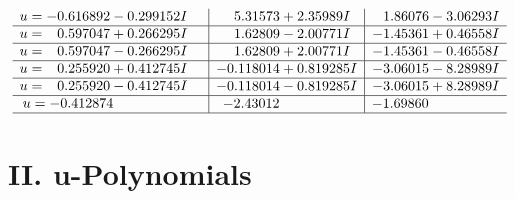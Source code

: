 \documentclass[1p]{elsarticle_modified}
\theoremstyle{definition}
\begin{document}
$$\begin{array}{c|c|c}
\begin{aligned}
u &= -0.616892 - 0.299152 I\end{aligned}
 & \phantom{-}5.31573 + 2.35989 I & \phantom{-}1.86076 - 3.06293 I \\ \hline\begin{aligned}
u &= \phantom{-}0.597047 + 0.266295 I\end{aligned}
 & \phantom{-}1.62809 - 2.00771 I & -1.45361 + 0.46558 I \\ \hline\begin{aligned}
u &= \phantom{-}0.597047 - 0.266295 I\end{aligned}
 & \phantom{-}1.62809 + 2.00771 I & -1.45361 - 0.46558 I \\ \hline\begin{aligned}
u &= \phantom{-}0.255920 + 0.412745 I\end{aligned}
 & -0.118014 + 0.819285 I & -3.06015 - 8.28989 I \\ \hline\begin{aligned}
u &= \phantom{-}0.255920 - 0.412745 I\end{aligned}
 & -0.118014 - 0.819285 I & -3.06015 + 8.28989 I \\ \hline\begin{aligned}
u &= -0.412874\phantom{ +0.000000I}\end{aligned}
 & -2.43012\phantom{ +0.000000I} & -1.69860\phantom{ +0.000000I}\\
 \hline 
 \end{array}$$\newpage
\newpage\renewcommand{\arraystretch}{1}
\centering \section*{ II. u-Polynomials}
\end{document}
